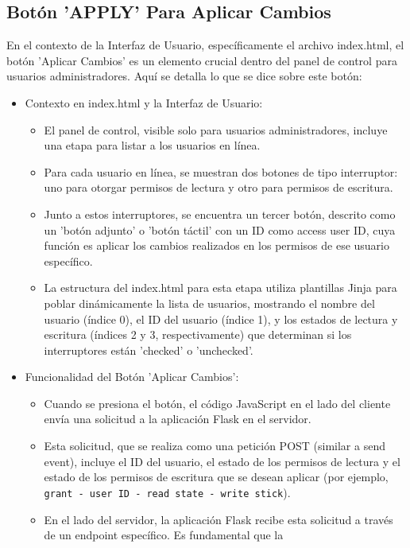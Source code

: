 \documentclass{report}
\begin{document}
\subsection{Botón 'APPLY' Para Aplicar Cambios}
En el contexto de la Interfaz de Usuario, específicamente el archivo index.html, el botón 'Aplicar Cambios' es un elemento crucial 
dentro del panel de control para usuarios administradores.
Aquí se detalla lo que se dice sobre este botón:
\begin{itemize}
    \item Contexto en index.html y la Interfaz de Usuario:
    \begin{itemize}
        \item El panel de control, visible solo para usuarios administradores, incluye una etapa para listar a los usuarios en línea.
        \item Para cada usuario en línea, se muestran dos botones de tipo interruptor: uno para otorgar permisos de lectura y otro para 
        permisos de escritura.
        \item Junto a estos interruptores, se encuentra un tercer botón, descrito como un 'botón adjunto' o 'botón táctil' con un ID como 
        access user ID, cuya función es aplicar los cambios realizados en los permisos de ese usuario específico.
        \item La estructura del index.html para esta etapa utiliza plantillas Jinja para poblar dinámicamente la lista de usuarios, 
        mostrando el nombre del usuario (índice 0), el ID del usuario (índice 1), y los estados de lectura y escritura (índices 2 y 3, 
        respectivamente) que determinan si los interruptores están 'checked' o 'unchecked'.
    \end{itemize}
    \item Funcionalidad del Botón 'Aplicar Cambios':
    \begin{itemize}
        \item Cuando se presiona el botón, el código JavaScript en el lado del cliente envía una solicitud a la aplicación Flask en el servidor.
        \item Esta solicitud, que se realiza como una petición POST (similar a send event), incluye el ID del usuario, el estado de los permisos 
        de lectura y el estado de los permisos de escritura que se desean aplicar (por ejemplo, \verb|grant - user ID - read state - write stick|).
        \item En el lado del servidor, la aplicación Flask recibe esta solicitud a través de un endpoint específico. Es fundamental que la 

\end{itemize}
\end{itemize}
\end{document}
